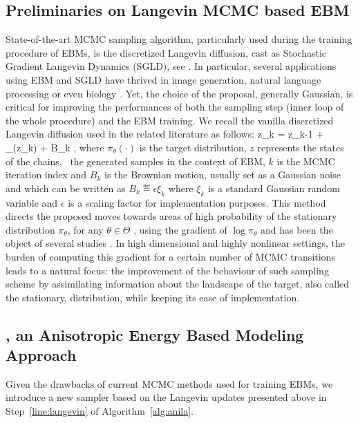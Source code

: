 \documentclass[letterpaper]{article} %
\begin{document}
\subsection{Preliminaries on Langevin MCMC based EBM}
State-of-the-art MCMC sampling algorithm, particularly used during the training procedure of EBMs, is the discretized Langevin diffusion, cast as Stochastic Gradient Langevin Dynamics (SGLD), see \cite{welling2011bayesian}.
In particular, several applications using EBM and SGLD have thrived in image generation, natural language processing or even biology \cite{du2020energy}.
Yet, the choice of the proposal, generally Gaussian, is critical for improving the performances of both the sampling step (inner loop of the whole procedure) and the EBM training.
We recall the vanilla discretized Langevin diffusion used in the related literature as follows:
\beq\notag
z_k = z_{k-1} +  \nabla \log \pi_\theta(z_k) + \sqrt{\gamma} B_k \eqsp,
\eeq
where $\pi_\theta(\cdot)$ is the target distribution, $z$ represents the states of the chains, \ie\ the generated samples in the context of EBM, $k$ is the MCMC iteration index and $B_k$ is the Brownian motion, usually set as a Gaussian noise and which can be written as $B_k \eqdef \epsilon \xi_k$ where $\xi_k$ is a standard Gaussian random variable and $\epsilon$ is a scaling factor for implementation purposes.
This method directs the proposed moves towards areas of high probability of the stationary distribution $\pi_\theta$, for any $\theta \in \Theta$ , using the gradient of $\log \pi_{\theta}$ and has been the object of several studies \cite{girolami,cotter2013mcmc}.
In high dimensional and highly nonlinear settings, the burden of computing this gradient for a certain number of MCMC transitions leads to a natural focus: the improvement of the behaviour of such sampling scheme by assimilating information about the landscape of the target, also called the stationary, distribution, while keeping its ease of implementation.

\subsection{\algo, an Anisotropic Energy Based Modeling Approach}

Given the drawbacks of current MCMC methods used for training EBMs, we introduce a new sampler based on the Langevin updates presented above in Step~\ref{line:langevin} of Algorithm~\ref{alg:anila}.
\end{document}
